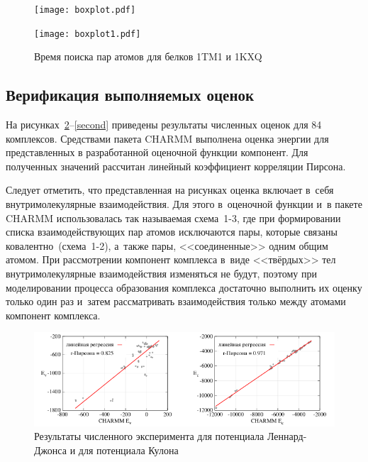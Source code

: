 \begin{figure}[h!]
    \begin{minipage}{.5\textwidth}
	\centering\texttt{[image: boxplot.pdf]}
    \end{minipage}
    \hfill
    \begin{minipage}{.5\textwidth}
	\centering\texttt{[image: boxplot1.pdf]}
    \end{minipage}  
    \caption{Время поиска пар атомов для белков 1TM1 и 1KXQ}
    \label{belki}
\end{figure}


\subsection{Верификация выполняемых оценок}


На рисунках~\ref{first}--\ref{second} приведены результаты численных оценок для 84 комплексов. Средствами пакета CHARMM выполнена оценка энергии для представленных в разработанной оценочной функции компонент. Для полученных значений рассчитан линейный коэффициент корреляции Пирсона.

Следует отметить, что представленная на рисунках оценка включает в~себя внутримолекулярные взаимодействия. Для этого в~оценочной функции и~в пакете CHARMM использовалась так называемая схема~1-3, где при формировании списка взаимодействующих пар атомов исключаются пары, которые связаны ковалентно~(схема~1-2), а~также пары, <<соединенные>> одним общим атомом. При рассмотрении компонент комплекса в~виде <<твёрдых>> тел внутримолекулярные взаимодействия изменяться не будут, поэтому при моделировании процесса образования комплекса достаточно выполнить их оценку только один раз и~затем рассматривать взаимодействия только между атомами компонент комплекса.

\begin{figure}[h!]
	\centering
	\includegraphics[width=1.0\linewidth]{images/first.pdf}
	\caption{Результаты численного эксперимента для потенциала Леннард-Джонса и для потенциала Кулона}
	\label{first}
\end{figure}

